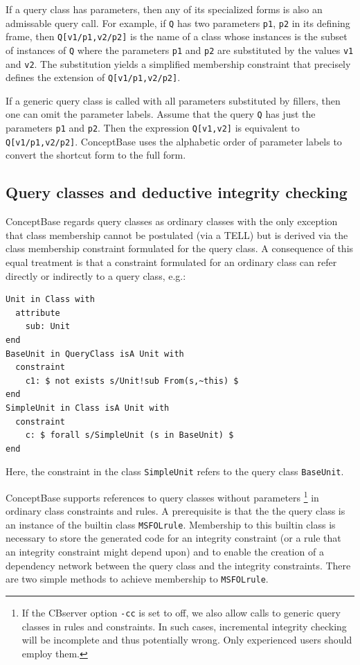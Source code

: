 If a query class has parameters, then any of its specialized forms is also an admissable
query call. For example, if {\tt Q} has two parameters {\tt p1}, {\tt p2} in its
defining frame, then {\tt Q[v1/p1,v2/p2]} is the name of a class whose instances
is the subset of instances of {\tt Q} where the parameters {\tt p1} and {\tt p2} are
substituted by the values {\tt v1} and {\tt v2}. The substitution yields a simplified
membership constraint that precisely defines the extension of {\tt Q[v1/p1,v2/p2]}.

If a generic query class is called with all parameters substituted by fillers, then
one can omit the parameter labels. Assume that the query {\tt Q} has just the parameters
{\tt p1} and {\tt p2}. Then the expression {\tt Q[v1,v2]} is equivalent to {\tt Q[v1/p1,v2/p2]}.
ConceptBase uses the alphabetic order of parameter labels to convert the shortcut form
to the full form. 



\subsection{Query classes and deductive integrity checking} \label{sec:qcic}

ConceptBase regards query classes as ordinary classes with the
only exception that class membership cannot be postulated (via a TELL)
but is derived via the class membership constraint formulated for
the query class. A consequence of this equal treatment is that
a constraint formulated for an ordinary class can refer directly
or indirectly to a query class, e.g.:

{\small
\begin{verbatim}
Unit in Class with
  attribute
    sub: Unit
end
BaseUnit in QueryClass isA Unit with
  constraint
    c1: $ not exists s/Unit!sub From(s,~this) $
end
SimpleUnit in Class isA Unit with
  constraint
    c: $ forall s/SimpleUnit (s in BaseUnit) $
end
\end{verbatim}
}

Here, the constraint in the class {\tt SimpleUnit} refers to
the query class {\tt BaseUnit}.

ConceptBase supports references to query classes without parameters%
\footnote{If the CBserver option {\tt -cc} is set to off, we also allow
calls to generic query classes in rules and constraints. In such cases,
incremental integrity checking will be incomplete and thus potentially wrong. Only experienced
users should employ them.}
in ordinary class constraints and rules.
A prerequisite is that the the query class is an instance of the builtin class
{\tt MSFOLrule}. Membership to this builtin class is necessary to
store the generated code for an integrity constraint (or a rule that an
integrity constraint might depend upon) and to enable the creation of
a dependency network between the query class and the integrity constraints.
There are two simple methods to achieve membership to {\tt MSFOLrule}.

